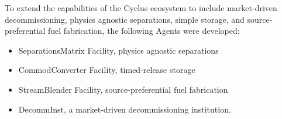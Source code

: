 
To extend the capabilities of the Cyclus ecosystem to include market-driven 
decommissioning, physics agnostic separations, simple storage, and 
source-preferential fuel fabrication, the following Agents were developed:

\begin{itemize}
\item SeparationsMatrix Facility, physics agnostic separations
\item CommodConverter Facility, timed-release storage
\item StreamBlender Facility, source-preferential fuel fabrication 
\item DecommInst, a market-driven decommissioning institution.
\end{itemize}

